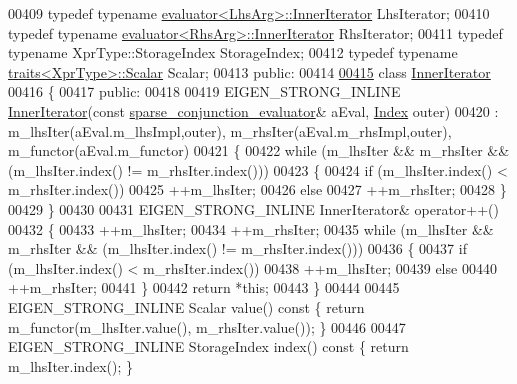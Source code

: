 \begin{DoxyCode}
00409   \textcolor{keyword}{typedef} \textcolor{keyword}{typename} \hyperlink{struct_eigen_1_1internal_1_1evaluator}{evaluator<LhsArg>::InnerIterator}  LhsIterator;
00410   \textcolor{keyword}{typedef} \textcolor{keyword}{typename} \hyperlink{struct_eigen_1_1internal_1_1evaluator}{evaluator<RhsArg>::InnerIterator}  RhsIterator;
00411   \textcolor{keyword}{typedef} \textcolor{keyword}{typename} XprType::StorageIndex StorageIndex;
00412   \textcolor{keyword}{typedef} \textcolor{keyword}{typename} \hyperlink{struct_eigen_1_1internal_1_1traits}{traits<XprType>::Scalar} Scalar;
00413 \textcolor{keyword}{public}:
00414 
\hyperlink{class_eigen_1_1internal_1_1sparse__conjunction__evaluator_3_01_xpr_type_00_01_iterator_based_00_c2f169adc5f8760251f1bd99603a9afc}{00415}   \textcolor{keyword}{class }\hyperlink{class_eigen_1_1_inner_iterator}{InnerIterator}
00416   \{
00417   \textcolor{keyword}{public}:
00418     
00419     EIGEN\_STRONG\_INLINE \hyperlink{class_eigen_1_1_inner_iterator}{InnerIterator}(\textcolor{keyword}{const} 
      \hyperlink{struct_eigen_1_1internal_1_1sparse__conjunction__evaluator}{sparse\_conjunction\_evaluator}& aEval, \hyperlink{namespace_eigen_a62e77e0933482dafde8fe197d9a2cfde}{Index} outer)
00420       : m\_lhsIter(aEval.m\_lhsImpl,outer), m\_rhsIter(aEval.m\_rhsImpl,outer), m\_functor(aEval.m\_functor)
00421     \{
00422       \textcolor{keywordflow}{while} (m\_lhsIter && m\_rhsIter && (m\_lhsIter.index() != m\_rhsIter.index()))
00423       \{
00424         \textcolor{keywordflow}{if} (m\_lhsIter.index() < m\_rhsIter.index())
00425           ++m\_lhsIter;
00426         \textcolor{keywordflow}{else}
00427           ++m\_rhsIter;
00428       \}
00429     \}
00430 
00431     EIGEN\_STRONG\_INLINE InnerIterator& operator++()
00432     \{
00433       ++m\_lhsIter;
00434       ++m\_rhsIter;
00435       \textcolor{keywordflow}{while} (m\_lhsIter && m\_rhsIter && (m\_lhsIter.index() != m\_rhsIter.index()))
00436       \{
00437         \textcolor{keywordflow}{if} (m\_lhsIter.index() < m\_rhsIter.index())
00438           ++m\_lhsIter;
00439         \textcolor{keywordflow}{else}
00440           ++m\_rhsIter;
00441       \}
00442       \textcolor{keywordflow}{return} *\textcolor{keyword}{this};
00443     \}
00444     
00445     EIGEN\_STRONG\_INLINE Scalar value()\textcolor{keyword}{ const }\{ \textcolor{keywordflow}{return} m\_functor(m\_lhsIter.value(), m\_rhsIter.value()); \}
00446 
00447     EIGEN\_STRONG\_INLINE StorageIndex index()\textcolor{keyword}{ const }\{ \textcolor{keywordflow}{return} m\_lhsIter.index(); \}

\end{DoxyCode}
